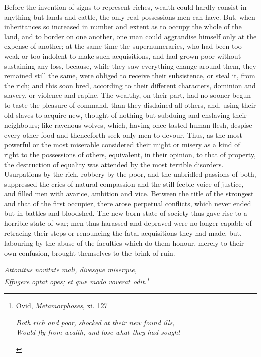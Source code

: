 \documentclass[12pt]{report}
\begin{document}
Before the invention of signs to represent riches, wealth could hardly consist in anything but lands and cattle, the only real possessions men can have. But, when inheritances so increased in number and extent as to occupy the whole of the land, and to border on one another, one man could aggrandise himself only at the expense of another; at the same time the supernumeraries, who had been too weak or too indolent to make such acquisitions, and had grown poor without sustaining any loss, because, while they saw everything change around them, they remained still the same, were obliged to receive their subsistence, or steal it, from the rich; and this soon bred, according to their different characters, dominion and slavery, or violence and rapine. The wealthy, on their part, had no sooner begun to taste the pleasure of command, than they disdained all others, and, using their old slaves to acquire new, thought of nothing but subduing and enslaving their neighbours; like ravenous wolves, which, having once tasted human flesh, despise every other food and thenceforth seek only men to devour.
\clearpage
Thus, as the most powerful or the most miserable considered their might or misery as a kind of right to the possessions of others, equivalent, in their opinion, to that of property, the destruction of equality was attended by the most terrible disorders. Usurpations by the rich, robbery by the poor, and the unbridled passions of both, suppressed the cries of natural compassion and the still feeble voice of justice, and filled men with avarice, ambition and vice. Between the title of the strongest and that of the first occupier, there arose perpetual conflicts, which never ended but in battles and bloodshed. The new-born state of society thus gave rise to a horrible state of war; men thus harassed and depraved were no longer capable of retracing their steps or renouncing the fatal acquisitions they had made, but, labouring by the abuse of the faculties which do them honour, merely to their own confusion, brought themselves to the brink of ruin.
\begin{displayquote}
\itshape Attonitus novitate mali, divesque miserque,  \\
Effugere optat opes; et quæ modo voverat odit.\footnote{Ovid, \textit{Metamorphoses}, xi. 127 
\begin{displayquote}
\itshape Both rich and poor, shocked at their new found ills, \\
Would fly from wealth, and lose what they had sought
\end{displayquote}}
\end{displayquote}
\end{document}
